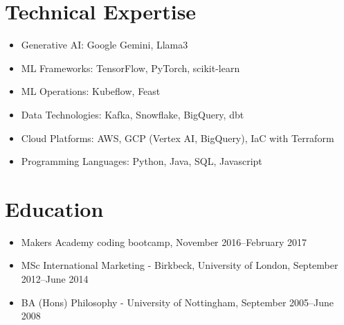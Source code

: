 \documentclass[a4paper]{scrartcl}
\begin{document}
\section*{Technical Expertise}
\begin{itemize}
	\item Generative AI: Google Gemini, Llama3
	\item ML Frameworks: TensorFlow, PyTorch, scikit-learn
	\item ML Operations: Kubeflow, Feast
	\item Data Technologies: Kafka, Snowflake, BigQuery, dbt
	\item Cloud Platforms: AWS, GCP (Vertex AI, BigQuery), IaC with Terraform
	\item Programming Languages: Python, Java, SQL, Javascript
\end{itemize}

\section*{Education}
\begin{itemize}
	\item Makers Academy coding bootcamp, November 2016--February 2017
	\item MSc International Marketing - Birkbeck, University of London, September 2012--June 2014
	\item BA (Hons) Philosophy - University of Nottingham, September 2005--June 2008
\end{itemize}
\end{document}
